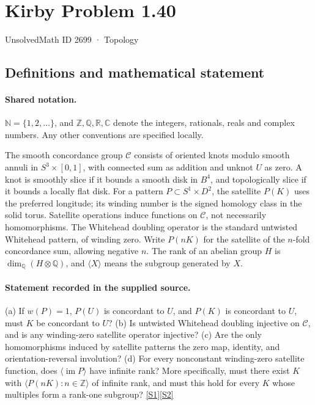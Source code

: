 \documentclass[11pt]{article}
\newcommand{\sref}[2]{\hyperlink{source:#1:#2}{[S#2]}}
\begin{document}
\setcounter{section}{2698}
\section{Kirby Problem 1.40}\label{2699}
{\small\sffamily UnsolvedMath ID 2699 · Topology}
\subsection{Definitions and mathematical statement}

\paragraph{Shared notation.}$\mathbb N=\{1,2,\ldots\}$, and $\mathbb Z,\mathbb Q,\mathbb R,\mathbb C$ denote the integers, rationals, reals and complex numbers. Any other conventions are specified locally.


The smooth concordance group $\mathcal C$ consists of oriented knots modulo smooth annuli in $S^3\times[0,1]$, with connected sum as addition and unknot $U$ as zero. A knot is smoothly slice if it bounds a smooth disk in $B^4$, and topologically slice if it bounds a locally flat disk. For a pattern $P\subset S^1\times D^2$, the satellite $P(K)$ uses the preferred longitude; its winding number is the signed homology class in the solid torus. Satellite operations induce functions on $\mathcal C$, not necessarily homomorphisms. The Whitehead doubling operator is the standard untwisted Whitehead pattern, of winding zero. Write $P(nK)$ for the satellite of the $n$-fold concordance sum, allowing negative $n$. The rank of an abelian group $H$ is $\dim_{\mathbb Q}(H\otimes\mathbb Q)$, and $\langle X\rangle$ means the subgroup generated by $X$.
\paragraph{Statement recorded in the supplied source.}
(a) If $w(P)=1$, $P(U)$ is concordant to $U$, and $P(K)$ is concordant to $U$, must $K$ be concordant to $U$? (b) Is untwisted Whitehead doubling injective on $\mathcal C$, and is any winding-zero satellite operator injective? (c) Are the only homomorphisms induced by satellite patterns the zero map, identity, and orientation-reversal involution? (d) For every nonconstant winding-zero satellite function, does $\langle\operatorname{im}P\rangle$ have infinite rank? More specifically, must there exist $K$ with $\langle P(nK):n\in\mathbb Z\rangle$ of infinite rank, and must this hold for every $K$ whose multiples form a rank-one subgroup? \sref{2699}{1}\sref{2699}{2}
\end{document}

